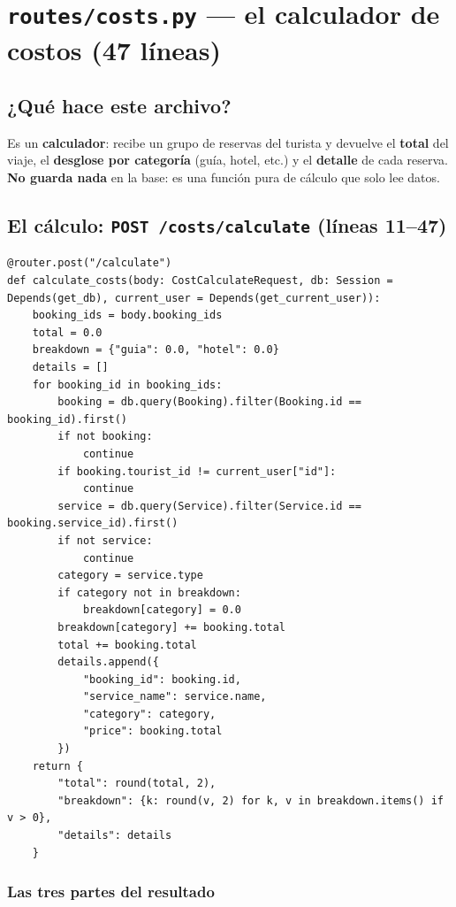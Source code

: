 \documentclass[11pt,a4paper]{article}
\begin{document}
\section{\texttt{routes/costs.py} --- el calculador de costos (47 líneas)}

\subsection{¿Qué hace este archivo?}

Es un \textbf{calculador}: recibe un grupo de reservas del turista y devuelve el \textbf{total}
del viaje, el \textbf{desglose por categoría} (guía, hotel, etc.) y el \textbf{detalle} de cada
reserva. \textbf{No guarda nada} en la base: es una función pura de cálculo que solo lee datos.

\subsection{El cálculo: \texttt{POST /costs/calculate} (líneas 11--47)}

\begin{lstlisting}
@router.post("/calculate")
def calculate_costs(body: CostCalculateRequest, db: Session = Depends(get_db), current_user = Depends(get_current_user)):
    booking_ids = body.booking_ids
    total = 0.0
    breakdown = {"guia": 0.0, "hotel": 0.0}
    details = []
    for booking_id in booking_ids:
        booking = db.query(Booking).filter(Booking.id == booking_id).first()
        if not booking:
            continue
        if booking.tourist_id != current_user["id"]:
            continue
        service = db.query(Service).filter(Service.id == booking.service_id).first()
        if not service:
            continue
        category = service.type
        if category not in breakdown:
            breakdown[category] = 0.0
        breakdown[category] += booking.total
        total += booking.total
        details.append({
            "booking_id": booking.id,
            "service_name": service.name,
            "category": category,
            "price": booking.total
        })
    return {
        "total": round(total, 2),
        "breakdown": {k: round(v, 2) for k, v in breakdown.items() if v > 0},
        "details": details
    }
\end{lstlisting}

\subsubsection{Las tres partes del resultado}
\end{document}
